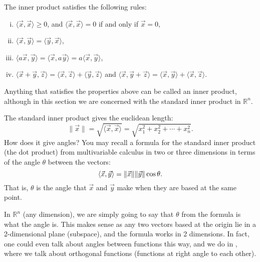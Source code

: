 The inner product satisfies the following rules:
\begin{enumerate}[(i)]
\item $\langle \vec{x} , \vec{x} \rangle \geq 0$, and
$\langle \vec{x} , \vec{x} \rangle = 0$ if and only if $\vec{x} = 0$,
\item $\langle \vec{x} , \vec{y} \rangle = \langle \vec{y} , \vec{x}
\rangle$,
\item $\langle a\vec{x} , \vec{y} \rangle =
\langle \vec{x} , a\vec{y} \rangle =
a \langle \vec{x} , \vec{y} \rangle$,
\item $\langle \vec{x} +  \vec{y} , \vec{z} \rangle =
\langle \vec{x} , \vec{z} \rangle +
\langle \vec{y} , \vec{z} \rangle$ and
$\langle \vec{x}, \vec{y} + \vec{z} \rangle =
\langle \vec{x} , \vec{y} \rangle +
\langle \vec{x} , \vec{z} \rangle$.
\end{enumerate}
Anything that satisfies the properties above can be called an inner
product, although in this section we are concerned with the
standard inner product in ${\mathbb{R}}^n$.

\medskip

The standard inner product gives the euclidean length:
\begin{equation*}
\lVert{\vec{x}}\rVert = \sqrt{\langle \vec{x}, \vec{x} \rangle}
= \sqrt{x_1^2 + x_2^2 + \cdots + x_n^2} .
\end{equation*}
How does it give angles?
You may recall a formula
for the standard inner product (the dot product)
from multivariable calculus in
two or three dimensions
in terms of
the angle $\theta$ between the vectors:
\begin{equation*}
\langle \vec{x}, \vec{y} \rangle
=
\lVert{\vec{x}}\rVert \lVert{\vec{y}}\rVert \cos \theta.
\avoidbreak
\end{equation*}
That is, $\theta$ is the angle that $\vec{x}$ and $\vec{y}$ make
when they are based at the same point.

In ${\mathbb{R}}^n$ (any dimension), we are simply going to say that $\theta$
from the formula is what the angle is.
This makes sense as any two vectors based at the origin
lie in a 2-dimensional plane (subspace),
and the formula works in 2 dimensions.
In fact, one could even talk about angles between functions this way, and
we do in , where we talk about orthogonal functions
(functions at right angle to each other).

